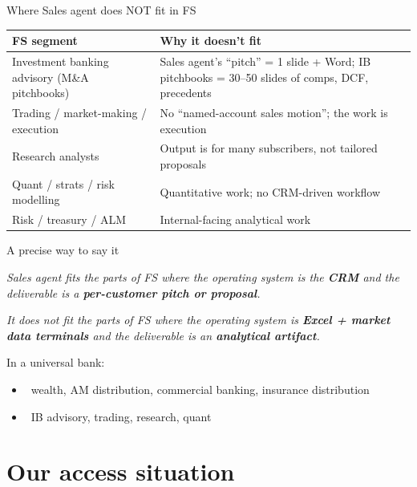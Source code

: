 \documentclass[11pt,aspectratio=169]{beamer}
\newcommand{\good}{\textcolor{successgreen}{\checkmark}}
\newcommand{\bad}{\textcolor{warningred}{\textbf{\texttimes}}}
\newcommand{\hl}[1]{\textbf{\textcolor{accentteal}{#1}}}
\begin{document}
\begin{frame}{Where Sales agent does NOT fit in FS}
  \centering\footnotesize
  \begin{tabular}{lp{}}
    \toprule
    \textbf{FS segment} & \textbf{Why it doesn't fit} \\
    \midrule
    Investment banking advisory (M\&A pitchbooks) & Sales agent's ``pitch'' = 1 slide + Word; IB pitchbooks = 30--50 slides of comps, DCF, precedents \\
    Trading / market-making / execution           & No ``named-account sales motion''; the work is execution \\
    Research analysts                             & Output is for many subscribers, not tailored proposals \\
    Quant / strats / risk modelling               & Quantitative work; no CRM-driven workflow \\
    Risk / treasury / ALM                         & Internal-facing analytical work \\
    \bottomrule
  \end{tabular}
\end{frame}

\begin{frame}{A precise way to say it}
  \begin{exampleblock}{}
    \textit{Sales agent fits the parts of FS where the operating system is the \hl{CRM} and the deliverable is a \hl{per-customer pitch or proposal}.}

    \medskip
    \textit{It does not fit the parts of FS where the operating system is \hl{Excel + market data terminals} and the deliverable is an \hl{analytical artifact}.}
  \end{exampleblock}

  \vfill
  In a universal bank:
  \begin{itemize}
    \item \good\ wealth, AM distribution, commercial banking, insurance distribution
    \item \bad\ IB advisory, trading, research, quant
  \end{itemize}
\end{frame}

\section{Our access situation}
\end{document}
